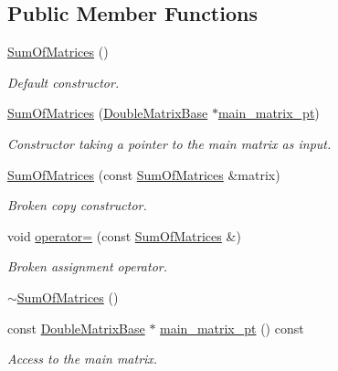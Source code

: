 \subsection*{Public Member Functions}
\begin{DoxyCompactItemize}
\item 
\hyperlink{classoomph_1_1SumOfMatrices_a627e945a69e2ba0709678e3ac0f8f195}{Sum\+Of\+Matrices} ()
\begin{DoxyCompactList}\small\item\em Default constructor. \end{DoxyCompactList}\item 
\hyperlink{classoomph_1_1SumOfMatrices_a1d482525c8a83e339b729c43667ca1a3}{Sum\+Of\+Matrices} (\hyperlink{classoomph_1_1DoubleMatrixBase}{Double\+Matrix\+Base} $\ast$\hyperlink{classoomph_1_1SumOfMatrices_a8e5bb86791c0d2b17703d45104e1d1ce}{main\+\_\+matrix\+\_\+pt})
\begin{DoxyCompactList}\small\item\em Constructor taking a pointer to the main matrix as input. \end{DoxyCompactList}\item 
\hyperlink{classoomph_1_1SumOfMatrices_ab539b15fa9a116675e5423187f9019aa}{Sum\+Of\+Matrices} (const \hyperlink{classoomph_1_1SumOfMatrices}{Sum\+Of\+Matrices} \&matrix)
\begin{DoxyCompactList}\small\item\em Broken copy constructor. \end{DoxyCompactList}\item 
void \hyperlink{classoomph_1_1SumOfMatrices_a8ede2928f871c55a77c567ebfb60b5ea}{operator=} (const \hyperlink{classoomph_1_1SumOfMatrices}{Sum\+Of\+Matrices} \&)
\begin{DoxyCompactList}\small\item\em Broken assignment operator. \end{DoxyCompactList}\item 
\hyperlink{classoomph_1_1SumOfMatrices_af6cc954e345acc8587bf861d92a678fc}{$\sim$\+Sum\+Of\+Matrices} ()
\item 
const \hyperlink{classoomph_1_1DoubleMatrixBase}{Double\+Matrix\+Base} $\ast$ \hyperlink{classoomph_1_1SumOfMatrices_a8e5bb86791c0d2b17703d45104e1d1ce}{main\+\_\+matrix\+\_\+pt} () const
\begin{DoxyCompactList}\small\item\em Access to the main matrix. \end{DoxyCompactList}\item 

\end{DoxyCompactItemize}
